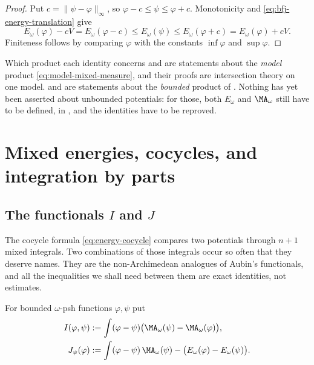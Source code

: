 \begin{proof}
Put \(c=\lVert\psi-\varphi\rVert_\infty\), so \(\varphi-c\leq\psi\leq\varphi+c\).
Monotonicity and \eqref{eq:bfj-energy-translation} give
\[
 E_\omega(\varphi)-cV=E_\omega(\varphi-c)
 \leq E_\omega(\psi)\leq E_\omega(\varphi+c)=E_\omega(\varphi)+cV .
\]
Finiteness follows by comparing \(\varphi\) with the constants
\(\inf\varphi\) and \(\sup\varphi\).
\end{proof}

\begin{warning}{Which product each identity concerns}
 and  are statements about
the \emph{model} product \eqref{eq:model-mixed-measure}, and their proofs are
intersection theory on one model.   and
 are statements about the \emph{bounded}
product of .  Nothing has yet been asserted
about unbounded potentials: for those, both \(E_\omega\) and
\(\MA_\omega\) still have to be defined, in
, and the identities have to
be reproved.
\end{warning}

\section{Mixed energies, cocycles, and integration by parts}
\label{sec:ch26-mixed}

\subsection{The functionals \texorpdfstring{\(I\)}{I} and
\texorpdfstring{\(J\)}{J}}
\label{sec:ch26-ij-def}

The cocycle formula \eqref{eq:energy-cocycle} compares two potentials through
\(n+1\) mixed integrals.  Two combinations of those integrals occur so often
that they deserve names.  They are the non-Archimedean analogues of Aubin's
functionals, and all the inequalities we shall need between them are exact
identities, not estimates.

\begin{definition}
\label{def:ch26-ij}
For bounded \(\omega\)-psh functions \(\varphi,\psi\) put
\begin{align}
\label{eq:ch26-I-definition}
 I(\varphi,\psi)
 &:=\int(\varphi-\psi)\bigl(\MA_\omega(\psi)-\MA_\omega(\varphi)\bigr),\\
\label{eq:ch26-J-definition}
 J_\psi(\varphi)
 &:=\int(\varphi-\psi)\,\MA_\omega(\psi)
    -\bigl(E_\omega(\varphi)-E_\omega(\psi)\bigr).
\end{align}
\end{definition}

